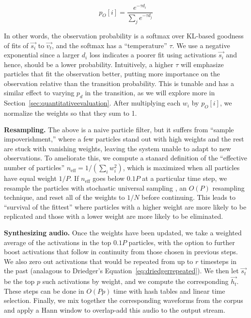 \documentclass{article}
\begin{document}
\begin{equation}
    \label{eq:observationprob}
    p_O[i] = \frac{e^{-\tau d_i}}{ \sum_{j} e^{-\tau d_j}}
\end{equation}

In other words, the observation probability is a softmax over KL-based goodness of fits of $\vec{s_i}$ to $\vec{v_t}$, and the softmax has a ``temperature'' $\tau$.  We use a negative exponential since a larger $d_i$ loss indicates a poorer fit using activations $\vec{s_i}$ and hence, should be a lower probability.  Intuitively, a higher $\tau$ will emphasize particles that fit the observation better, putting more importance on the observation relative than the transition probability.  This is tunable and has a similar effect to varying $p_d$ in the transition, as we will explore more in Section~\ref{sec:quantitativeevaluation}.  After multiplying each $w_i$ by $p_O[i]$, we normalize the weights so that they sum to 1.  

\textbf{Resampling.} The above is a naive particle filter, but it suffers from ``sample impoverishment,'' where a few particles stand out with high weights and the rest are stuck with vanishing weights, leaving the system unable to adapt to new observations.  To ameliorate this, we compute a stanard definition of the ``effective number of particles'' $n_{\text{eff}} = 1/(\sum_{i} w_i^2)$, which is maximized when all particles have equal weight $1/P$.  If $n_{\text{eff}}$ goes below $0.1P$ at a particular time step, we resample the particles with stochastic universal sampling \cite{kitagawa1996monte, carpenter1999improved}, an $O(P)$ resampling technique, and reset all of the weights to $1/N$ before continuing.  This leads to ``survival of the fittest'' where particles with a higher weight are more likely to be replicated and those with a lower weight are more likely to be eliminated.

\textbf{Synthesizing audio.} Once the weights have been updated, we take a weighted average of the activations in the top $0.1P$ particles, with the option to further boost activations that follow in continuity from those chosen in previous steps.  We also zero out activations that would be repeated from up to $r$ timesteps in the past (analagous to Driedger's Equation~\ref{eq:driedgerrepeated}).  We then let $\vec{s_t}$ be the top $p$ such activations by weight, and we compute the corresponding $\vec{h_t}$. These steps can be done in $O(Pp)$ time with hash tables and linear time selection.  Finally, we mix together the corresponding waveforms from the corpus and apply a Hann window to overlap-add this audio to the output stream.
\end{document}
